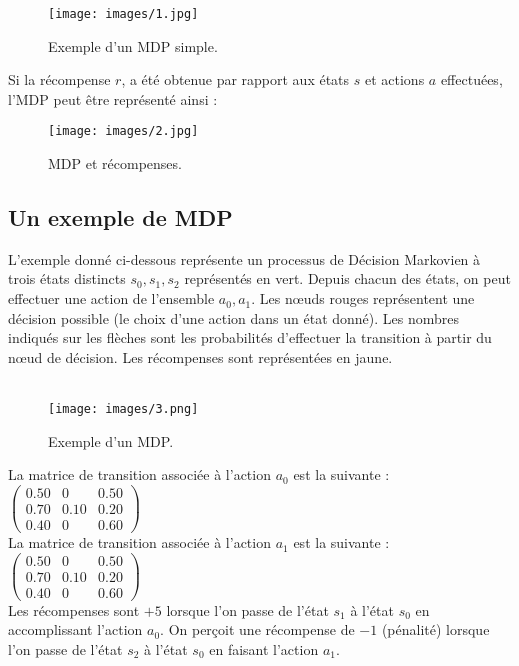 \documentclass{article}
\begin{document}
\begin{figure}[H]
\centering
\texttt{[image: images/1.jpg]}
\caption{\label{fig1}Exemple d'un MDP simple.}
\end{figure}

\noindent Si la récompense $r$, a été obtenue par rapport aux états $s$ et actions $a$ effectuées, l'MDP peut être représenté ainsi :

\begin{figure}[H]
\centering
\texttt{[image: images/2.jpg]}
\caption{\label{fig2}MDP et récompenses.}
\end{figure}

\subsection{Un exemple de MDP}
\noindent L'exemple donné ci-dessous représente un processus de Décision Markovien à trois états distincts $ s_0,s_1,s_2 $ représentés en vert. Depuis chacun des états, on peut effectuer une action de l'ensemble $a_0,a_1$. Les nœuds rouges représentent une décision possible (le choix d'une action dans un état donné). Les nombres indiqués sur les flèches sont les probabilités d'effectuer la transition à partir du nœud de décision. Les récompenses sont représentées en jaune.\\\\
\begin{figure}[H]
\centering
\texttt{[image: images/3.png]}
\caption{\label{fig1}Exemple d'un MDP.}
\end{figure}
\noindent La matrice de transition associée à l'action $ a_0 $ est la suivante :
$\begin{pmatrix}
0.50 & 0 & 0.50 \\
0.70 & 0.10 & 0.20 \\
0.40 & 0 & 0.60
\end{pmatrix}$\\
\noindent La matrice de transition associée à l'action $a_1 $ est la suivante :
$\begin{pmatrix}
0.50 & 0 & 0.50 \\
0.70 & 0.10 & 0.20 \\
0.40 & 0 & 0.60
\end{pmatrix}$
\\
Les récompenses sont $+5$ lorsque l'on passe de l'état $s_{1} $ à l'état $s_{0} $ en accomplissant l'action $a_0 $. On perçoit une récompense de $-1$ (pénalité) lorsque l'on passe de l'état $s_{2} $ à l'état $ s_0 $ en faisant l'action $a_1 $.
\end{document}
